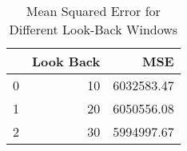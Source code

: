 \begin{table}
    \caption{Mean Squared Error for Different Look-Back Windows}
    \label{tab:mse_results}
    \begin{tabular}{lrr}
        \toprule
        & Look Back & MSE \\
        \midrule
        0 & 10 & 6032583.47 \\
        1 & 20 & 6050556.08 \\
        2 & 30 & 5994997.67 \\
        \bottomrule
    \end{tabular}
\end{table}

